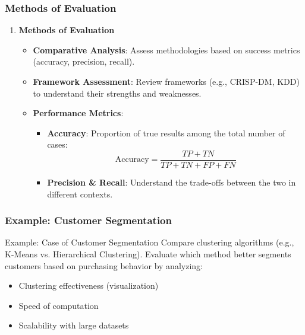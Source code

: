 \documentclass{beamer}
\begin{document}
\begin{frame}[fragile]
    \frametitle{Methods of Evaluation}
    \begin{enumerate}
        \item \textbf{Methods of Evaluation}
        \begin{itemize}
            \item \textbf{Comparative Analysis}:
            Assess methodologies based on success metrics (accuracy, precision, recall).
        
            \item \textbf{Framework Assessment}:
            Review frameworks (e.g., CRISP-DM, KDD) to understand their strengths and weaknesses.
        
            \item \textbf{Performance Metrics}:
            \begin{itemize}
                \item \textbf{Accuracy}: Proportion of true results among the total number of cases:
                \begin{equation}
                    \text{Accuracy} = \frac{TP + TN}{TP + TN + FP + FN}
                \end{equation}

                \item \textbf{Precision \& Recall}: Understand the trade-offs between the two in different contexts.
            \end{itemize}
        \end{itemize}
    \end{enumerate}
\end{frame}

\begin{frame}[fragile]
    \frametitle{Example: Customer Segmentation}
    \begin{block}{Example: Case of Customer Segmentation}
        Compare clustering algorithms (e.g., K-Means vs. Hierarchical Clustering).
        Evaluate which method better segments customers based on purchasing behavior by analyzing:
        \begin{itemize}
            \item Clustering effectiveness (visualization)
            \item Speed of computation
            \item Scalability with large datasets
        \end{itemize}
    \end{block}
\end{frame}
\end{document}
